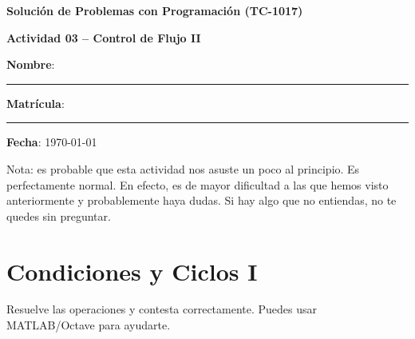 \documentclass[spanish, 10pt]{article}
\begin{document}
\begin{center}
	{\Large \textbf{Solución de Problemas con Programación (TC-1017)}}
	
	\bigskip
	{\large \textbf{Actividad 03 -- Control de Flujo II}}
\end{center}

\bigskip
{\large \textbf{Nombre}: \rule{13.7 cm}{0.4mm}}



\bigskip
{\large \textbf{Matrícula}: \rule{5 cm}{0.4mm}} \hfill {\large \textbf{Fecha}: \today}

\bigskip

{\footnotesize Nota: es probable que esta actividad nos asuste un poco al principio. Es perfectamente normal.
En efecto, es de mayor dificultad a las que hemos visto anteriormente y probablemente haya dudas.
Si hay algo que no entiendas, no te quedes sin preguntar.}

\section{Condiciones y Ciclos I}

Resuelve las operaciones y contesta correctamente. Puedes usar MATLAB/Octave para ayudarte.
\end{document}
